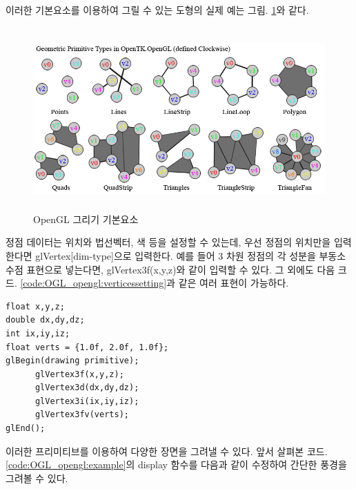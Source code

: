 이러한 기본요소를 이용하여 그릴 수 있는 도형의 실제 예는 그림. \ref{fig:OGL_opengl:primitives}와 같다.

\begin{figure}[h!]
  \centering
    \includegraphics[height=7cm]{OGL_opengl/primitives.png}
    \caption{OpenGL 그리기 기본요소}
    \label{fig:OGL_opengl:primitives}
\end{figure}

정점 데이터는 위치와 법선벡터, 색 등을 설정할 수 있는데, 우선 정점의 위치만을 입력한다면 glVertex[dim-type]으로 입력한다. 예를 들어 3 차원 정점의 각 성분을 부동소수점 표현으로 넣는다면, glVertex3f(x,y,z)와 같이 입력할 수 있다. 그 외에도 다음 크드. \ref{code:OGL_opengl:verticessetting}과 같은 여러 표현이 가능하다.

\begin{algorithmbis}[정점 데이터 설정 방법]\label{code:OGL_opengl:verticessetting}
\lstset{language=C++} 
\begin{lstlisting}
float x,y,z;
double dx,dy,dz;
int ix,iy,iz;
float verts = {1.0f, 2.0f, 1.0f};
glBegin(drawing primitive);
      glVertex3f(x,y,z);
      glVertex3d(dx,dy,dz);
      glVertex3i(ix,iy,iz);
      glVertex3fv(verts);
glEnd();
\end{lstlisting}
\end{algorithmbis}

이러한 프리미티브를 이용하여 다양한 장면을 그려낼 수 있다. 앞서 살펴본 코드. \ref{code:OGL_opengl:example}의 
display 함수를 다음과 같이 수정하여 간단한 풍경을 그려볼 수 있다. 

